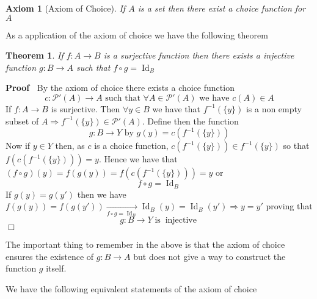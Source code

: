 \documentclass{book}
\newcommand{\Rightarrowlim}{\mathop{\rightarrow}\limits}
\newcommand{\tmop}[1]{\ensuremath{\operatorname{#1}}}
\newenvironment{proof}{\noindent\textbf{Proof\ }}{\hspace*{\fill}$\Box$\medskip}
\newtheorem{axiom}{Axiom}
{\theorembodyfont{\rmfamily}\newtheorem{convention}{Convention}}
\newtheorem{theorem}{Theorem}
\begin{document}
\begin{axiom}[Axiom of Choice]
  \label{axiom of choice}{}If $A$ is a set then there
  exist a choice function for $A$
\end{axiom}

As a application of the axiom of choice we have the following theorem

\begin{theorem}
  \label{function surjection and construction of inverse function}If $f : A
  \rightarrow B$ is a surjective function then there exists a injective
  function $g : B \rightarrow A$ such that $f \circ g = \tmop{Id}_B$
\end{theorem}

\begin{proof}
  By the axiom of choice there exists a choice function
  \[ c : \mathcal{P}' (A) \rightarrow A \text{ such that } \forall A \in
     \mathcal{P}' (A) \text{ we have } c (A) \in A \]
  If $f : A \rightarrow B$ is surjective. Then $\forall y \in B$ we have that
  $f^{- 1} (\{ y \})$ is a non empty subset of $A \Rightarrow f^{- 1} (\{ y
  \}) \in \mathcal{P}' (A)$. Define then the function
  \[ g : B \rightarrow Y \text{ by } g (y) = c (f^{- 1} (\{ y \})) \]
  Now if $y \in Y$ then, as $c$ is a choice function, $c (f^{- 1} (\{ y \}))
  \in f^{- 1} (\{ y \})$ so that $f (c (f^{- 1} (\{ y \}))) = y$. Hence we
  have that $(f \circ g) (y) = f (g (y)) = f (c (f^{- 1} (\{ y \}))) = y$ or
  \[ f \circ g = \tmop{Id}_B \]
  If $g (y) = g (y')$ then we have $f (g (y)) = f (g (y')) \Rightarrowlim_{f
  \circ g = \tmop{Id}_B} \tmop{Id}_B (y) = \tmop{Id}_B (y') \Rightarrow y =
  y'$ proving that
  \[ g : B \rightarrow Y \tmop{is} \tmop{injective} \]
\end{proof}

The important thing to remember in the above is that the axiom of choice
ensures the existence of $g : B \rightarrow A$ but does not give a way to
construct the function $g$ itself.

We have the following equivalent statements of the axiom of choice
\end{document}
